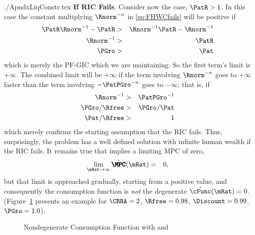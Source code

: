 \documentclass{econtex}
\begin{document}
\begin{verbatimwrite}{./ApndxLiqConstr.tex}
{\bf If RIC Fails}.  Consider now the  case, $\PatR > 1$.  In this case the constant multiplying
$\Rnorm^{-n}$ in \eqref{eq:FHWCfails} will be positive if
\begin{eqnarray*}
  \PatR \Rnorm^{-1} - \PatR & > &  \Rnorm^{-1}\PatR-\Rnorm^{-1}
\\ \Rnorm^{-1} & > & \PatR
\\ \PGro & > & \Pat
\end{eqnarray*}
which is merely the PF-GIC which we are maintaining.  So the first term's limit is $+\infty$.  The
combined limit will be $+\infty$ if the term involving $\Rnorm^{-n}$
goes to $+\infty$ faster than the term involving $-\PatPGro^{-n}$ goes to
$-\infty$; that is, if
\begin{eqnarray*}
  \Rnorm^{-1} & > & \PatPGro^{-1}
\\ \PGro/\Rfree & > & \PGro/\Pat
\\ \Pat/\Rfree & > & 1
\end{eqnarray*}
which merely confirms the starting assumption that the RIC fails.
Thus, surprisingly, the problem has a well defined solution with
infinite human wealth if the RIC fails.  It remains true that 
implies a limiting MPC of zero,
\begin{eqnarray}
  \lim_{\mRat \rightarrow \infty} \mathring{\pmb{\MPC}}(\mRat)  & = & 0,
\end{eqnarray}
but that limit is approached gradually, starting from a positive
value, and consequently the consumption function is {\it not} the
degenerate $\mathring{\cFunc}(\mRat)=0$.  (Figure~\ref{fig:PFGICHoldsFHWCFailsRICFails} presents an example for $\CRRA=2$, $\Rfree=0.98$, $\Discount = 0.99$, $\PGro = 1.0$).

\begin{figure}
\centerline{}
\caption{Nondegenerate Consumption Function with  and }
\label{fig:PFGICHoldsFHWCFailsRICFails}
\end{figure}


\end{verbatimwrite}
\end{document}
